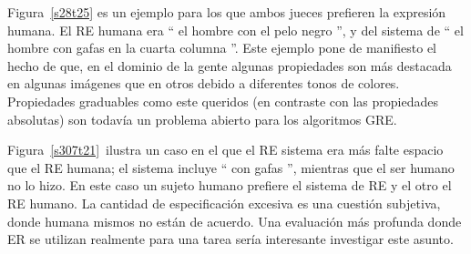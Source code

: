 


Figura~\ref{s28t25} es un ejemplo para los que ambos jueces prefieren la expresi\'on humana. El RE humana era `` el hombre con el pelo negro '', y del sistema de `` el hombre con gafas en la cuarta columna ''. Este ejemplo pone de manifiesto el hecho de que, en el dominio de la gente algunas propiedades son m\'as destacada en algunas im\'agenes que en otros debido a diferentes tonos de colores. Propiedades graduables como este queridos (en contraste con las propiedades absolutas) son todav\'{i}a un problema abierto para los algoritmos GRE.

Figura~\ref{s307t21}~ilustra un caso en el que el RE sistema era m\'as falte espacio que el RE humana; el sistema incluye `` con gafas '', mientras que el ser humano no lo hizo. En este caso un sujeto humano prefiere el sistema de RE y el otro el RE humano. La cantidad de especificaci\'on excesiva es una cuesti\'on subjetiva, donde humana mismos no est\'an de acuerdo. Una evaluaci\'on m\'as profunda donde ER se utilizan realmente para una tarea ser\'{i}a interesante investigar este asunto.

